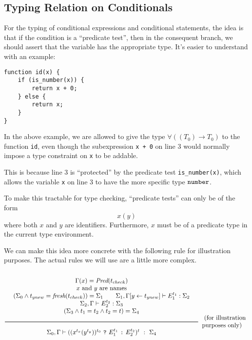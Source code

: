 \subsection{Typing Relation on Conditionals}

For the typing of conditional expressions and conditional statements,
the idea is that if the condition is a ``predicate test'',
then in the consequent branch, we should assert that the variable has the appropriate type.
It's easier to understand with an example:

\begin{lstlisting}
function id(x) {
    if (is_number(x)) {
        return x + 0;
    } else {
        return x;
    }
}
\end{lstlisting}

In the above example,
we are allowed to give the type $\forall((T_0) \to T_0)$ to the function \texttt{id},
even though the subexpression \texttt{x + 0} on line 3
would normally impose a type constraint on \texttt{x}
to be addable.

This is because line 3 is ``protected'' by the predicate test \texttt{is\_number(x)},
which allows the variable \texttt{x} on line 3
to have the more specific type $\texttt{number}$.

To make this tractable for type checking,
``predicate tests'' can only be of the form
\[ x(y) \]
where both $x$ and $y$ are identifiers.
Furthermore, $x$ must be of a predicate type in the current type environment.

We can make this idea more concrete with the following rule for illustration purposes.
The actual rules we will use are a little more complex.

\noindent
\[
  \Rule{
  \begin{array}{c}
  \Gamma(x) = \Pred(t_{check})
  \\
  x \text{ and } y \text{ are names}
  \\
  (\Sigma_0 \wedge t_{ynew} = \textit{fresh}(t_{check})) = \Sigma_1 \qquad
  \Sigma_1, \Gamma [ y \leftarrow t_{ynew} ] \vdash E_1^{t_1} : \Sigma_2
  \\
  \Sigma_2, \Gamma \vdash E_2^{t_2} : \Sigma_3
  \\
  (\Sigma_3 \wedge t_1 = t_2 \wedge t_2 = t) = \Sigma_{4}
  \end{array}
  }{
  \Sigma_0, \Gamma \vdash ( (x^{t_x}(y^{t_y}))^{t_0}\ \ThenOp\ E_1^{t_1}\ \ElseOp\ E_2^{t_2})^t\ :\ \Sigma_4}
  \begin{array}{l}
  \text{ (for illustration} \\
  \text{purposes only)}
  \end{array}
\]

